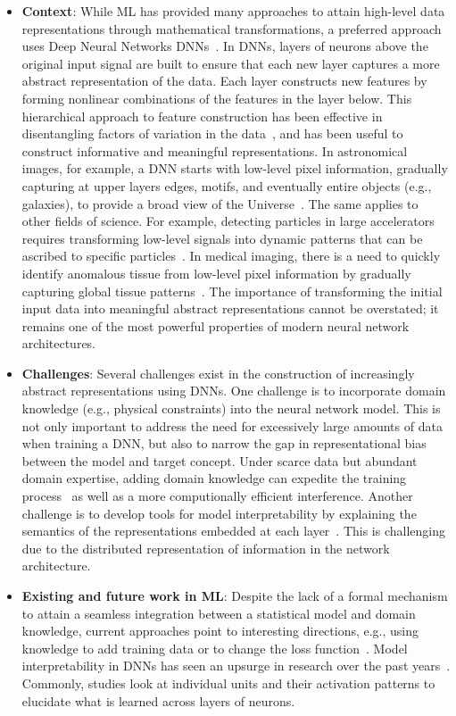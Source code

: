 \begin{itemize}
    \item \textbf{Context}: While ML has provided many approaches to attain high-level data representations through mathematical transformations, a preferred approach uses Deep Neural Networks DNNs~\cite{Goodfellow_2016}. In DNNs, layers of neurons above the original input signal are built to ensure that each new layer captures a more abstract representation of the data. Each layer constructs new features by forming nonlinear combinations of the features in the layer below. This hierarchical approach to feature construction has been effective in disentangling factors of variation in the data~\cite{Hinton_2006,Bengio_2013,Goodfellow_2016}, and has been useful to construct informative and meaningful representations. In astronomical images, for example, a DNN starts with low-level pixel information, gradually capturing at upper layers edges, motifs, and eventually entire objects (e.g., galaxies), to provide a broad view of the Universe~\cite{Sanchez_2018,Huertas_Company_2018}. The same applies to other fields of science. For example, detecting particles in large accelerators requires transforming low-level signals into dynamic patterns that can be ascribed to specific particles~\cite{Belayneh_2020}. In medical imaging, there is a need to quickly identify anomalous tissue from low-level pixel information by gradually capturing global tissue patterns~\cite{Bychkov_2018}. The importance of transforming the initial input data into meaningful abstract representations cannot be overstated; it remains one of the most powerful properties of modern neural network architectures. 
    \item \textbf{Challenges}: Several challenges exist in the construction of increasingly abstract representations using DNNs. One challenge is to incorporate domain knowledge (e.g., physical constraints) into the neural network model. This is not only important to address the need for excessively large amounts of data when training a DNN, but also to narrow the gap in representational bias between the model and target concept. Under scarce data but abundant domain expertise, adding domain knowledge can expedite the training process~\cite{Xie_2021} as well as a more computionally efficient interference. Another challenge is to develop tools for model interpretability by explaining the semantics of the representations embedded at each layer~\cite{Chakraborty_2017}. This is challenging due to the distributed representation of information in the network architecture. 
    \item \textbf{Existing and future work in ML}: Despite the lack of a formal mechanism to attain a seamless integration between a statistical model and domain knowledge, current approaches point to interesting directions, e.g., using knowledge to add training data or to change the loss function~\cite{Vo_2017}. Model interpretability in DNNs has seen an upsurge in research over the past years~\cite{Chakraborty_2017}. Commonly, studies look at individual units and their activation patterns to elucidate what is learned across layers of neurons. 
\end{itemize}

